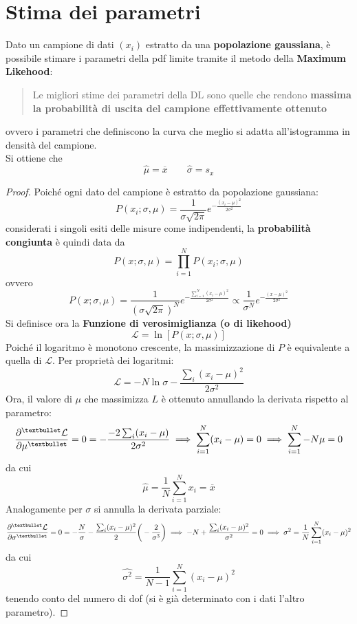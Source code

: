 \documentclass[10pt, oneside]{book}
\begin{document}
\section{Stima dei parametri}
Dato un campione di dati $(x_i)$ estratto da una \textbf{popolazione gaussiana}, è possibile stimare i parametri della pdf limite tramite il metodo della \textbf{Maximum Likehood}:
\begin{quote}
Le migliori stime dei parametri della DL sono quelle che rendono \textbf{massima la probabilità di uscita del campione effettivamente ottenuto}
\end{quote}
ovvero i parametri che definiscono la curva che meglio si adatta all'istogramma in densità del campione.\\
Si ottiene che
\[\hat{\mu} = \overline{x} \qquad \hat{\sigma} = s_x\]
\begin{proof}
Poiché ogni dato del campione è estratto da popolazione gaussiana:
\[P(x_i; \sigma, \mu) = \frac{1}{\sigma \sqrt{2\pi}} e^{\displaystyle - \frac{(x_i-\mu)^2}{2\sigma^2}}\]
considerati i singoli esiti delle misure come indipendenti, la \textbf{probabilità congiunta} è quindi data da
\[P(x; \sigma, \mu) = \prod\limits_{i=1}^N P(x_i; \sigma, \mu)\]
ovvero
\[P(x; \sigma,\mu) = \frac{1}{(\sigma \sqrt{2\pi})^N} e^{\displaystyle - \frac{\sum_{i=1}^N (x_i-\mu)^2}{2\sigma^2}} \propto \frac{1}{\sigma^N} e^{\displaystyle - \frac{(x-\mu)^2}{2\sigma^2}}\]
Si definisce ora la \textbf{Funzione di verosimiglianza (o di likehood)}
\[\mathcal{L} = \ln[P(x; \sigma, \mu)]\]
Poiché il logaritmo è monotono crescente, la massimizzazione di $P$ è equivalente a quella di $\mathcal{L}$. Per proprietà dei logaritmi:
\[\mathcal{L} = - N \ln \sigma - \frac{\sum_i (x_i - \mu)^2}{2 \sigma^2}\]
Ora, il valore di $\mu$ che massimizza $L$ è ottenuto annullando la derivata rispetto al parametro:
\[\pdv[•]{\mathcal{L}}{\mu} = 0 = - \frac{-2 \sum_i (x_i - \mu)}{2 \sigma^2} \implies \sum\limits_{i=1}^N (x_i - \mu) = 0 \implies \sum\limits_{i=1}^N - N \mu = 0\]
da cui
\[\hat{\mu} = \frac{1}{N} \sum\limits_{i=1}^N x_i = \overline{x}\]
Analogamente per $\sigma$ si annulla la derivata parziale:
\[\pdv[•]{\mathcal{L}}{\sigma} = 0 = - \frac{N}{\sigma} - \frac{\sum_i (x_i - \mu)^2}{2} \bigg(-\frac{2}{\sigma^3}\bigg) \implies - N + \frac{\sum_i (x_i - \mu)^2}{\sigma^2} = 0 \implies \sigma^2 = \frac{1}{N} \sum\limits_{i=1}^N (x_i - \mu)^2\]
da cui
\[\hat{\sigma^2} = \frac{1}{N-1} \sum\limits_{i=1}^N (x_i - \mu)^2\]
tenendo conto del numero di dof (si è già determinato con i dati l'altro parametro).
\end{proof}
\end{document}
